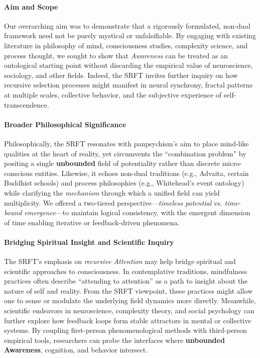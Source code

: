 \documentclass[12pt,a4paper]{article}
\begin{document}
\paragraph{Aim and Scope}
Our overarching aim was to demonstrate that a rigorously formulated, non-dual framework need not be purely mystical or unfalsifiable. By engaging with existing literature in philosophy of mind, consciousness studies, complexity science, and process thought, we sought to show that \emph{Awareness} can be treated as an ontological starting point without discarding the empirical value of neuroscience, sociology, and other fields. Indeed, the SRFT invites further inquiry on how recursive selection processes might manifest in neural synchrony, fractal patterns at multiple scales, collective behavior, and the subjective experience of self-transcendence.

\paragraph{Broader Philosophical Significance}
Philosophically, the SRFT resonates with panpsychism’s aim to place mind-like qualities at the heart of reality, yet circumvents the “combination problem” by positing a single \textbf{unbounded} field of potentiality rather than discrete micro-conscious entities. Likewise, it echoes non-dual traditions (e.g., Advaita, certain Buddhist schools) and process philosophies (e.g., Whitehead’s event ontology) while clarifying the \emph{mechanism} through which a unified field can yield multiplicity. We offered a two-tiered perspective—\emph{timeless potential} vs. \emph{time-bound emergence}—to maintain logical consistency, with the emergent dimension of time enabling iterative or feedback-driven phenomena.

\paragraph{Bridging Spiritual Insight and Scientific Inquiry}
The SRFT’s emphasis on \emph{recursive Attention} may help bridge spiritual and scientific approaches to consciousness. In contemplative traditions, mindfulness practices often describe “attending to attention” as a path to insight about the nature of self and reality. From the SRFT viewpoint, these practices might allow one to sense or modulate the underlying field dynamics more directly. Meanwhile, scientific endeavors in neuroscience, complexity theory, and social psychology can further explore how feedback loops form stable attractors in mental or collective systems. By coupling first-person phenomenological methods with third-person empirical tools, researchers can probe the interfaces where \textbf{unbounded Awareness}, cognition, and behavior intersect.
\end{document}
